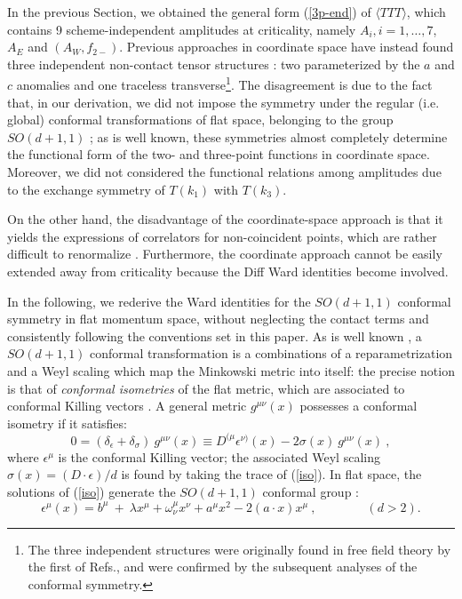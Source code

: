 \documentclass[11pt]{article}
\newcommand{\beq}{\begin{equation}}
\newcommand{\eeq}{\end{equation}}
\def\s{\sigma}
\def\d{\delta}
\def\eps{\epsilon}
\def\TTT{\bra TTT\ket}
\def\bra{\langle}
\def\ket{\rangle}
\begin{document}
In the previous Section, we obtained the general form (\ref{3p-end}) of 
$\TTT$, which contains 9 scheme-independent amplitudes at criticality,
namely $A_i, i=1,\dots,7$, $A_E$ and $(A_W, f_{2-})$.
Previous approaches in coordinate space 
have instead found three independent non-contact tensor structures
\cite{eo}\cite{ol}: two parameterized by the $a$ and $c$ anomalies 
and one traceless transverse\footnote{
The three independent structures were originally found in free field theory
by the first of Refs.\cite{eo}, and
were confirmed by the subsequent analyses of the conformal symmetry.
}.
The disagreement is due to the fact that,  
in our derivation, we did not impose 
the symmetry under the regular (i.e. global) conformal transformations of
flat space, belonging to the group $SO(d+1,1)$ \cite{pdf}\cite{cc};
as is well known, these symmetries almost completely determine
the functional form of the two- and three-point functions in coordinate 
space. Moreover, we did not considered the functional relations 
among amplitudes due to the exchange symmetry of $T(k_1)$ 
with $T(k_3)$.

On the other hand, the disadvantage of the coordinate-space
approach is that it yields the expressions of correlators 
for non-coincident points, which are rather difficult to
renormalize \cite{eo}. Furthermore, the coordinate approach
cannot be easily extended away from criticality
because the Diff Ward identities become involved.

In the following, we rederive the Ward identities
for the $SO(d+1,1)$ conformal symmetry in flat momentum space, without
neglecting the contact terms and consistently following the
conventions set in this paper.
As is well known \cite{cc}, a $SO(d+1,1)$ conformal transformation
is a combinations of a reparametrization and a Weyl scaling
which map the Minkowski metric into itself: the precise
notion is that of {\it conformal isometries} of the flat metric, 
which are associated to conformal Killing vectors \cite{bd}.
A general metric $g^{\mu\nu}(x)$ possesses a conformal isometry 
if it satisfies:
\beq
0=\left( \d_\eps + \d_\s \right) \ g^{\mu\nu}(x) \equiv
D^{(\mu} \eps^{\nu)}(x) -2 \s(x) \ g^{\mu\nu}(x) \ ,
\label{iso}\eeq
where $\eps^\mu$ is the conformal Killing vector;
the associated Weyl scaling  $\s(x)= (D\cdot \eps)/d$ is found
by taking the trace of (\ref{iso}).
In flat space, the solutions of (\ref{iso}) generate
the $SO(d+1,1)$ conformal group \cite{pdf}:
\beq
\eps^\mu(x)= b^\mu \ + \ \lambda x^\mu +\omega^\mu_\nu x^\nu +
a^\mu x^2 -2 (a\cdot x) x^\mu \ , \qquad\qquad (d>2).
\label{conf-eps}\eeq
\end{document}
